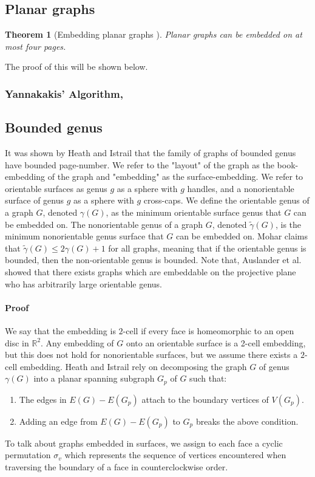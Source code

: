 \documentclass[]{article}
\newtheorem{theorem}{Theorem}
\theoremstyle{definition}
\numberwithin{theorem}{section}
\numberwithin{equation}{section}
\begin{document}
\subsection{Planar graphs}\label{ssec:Planar_Graphs}
\begin{theorem}[Embedding planar graphs \cite{yannakakisEmbeddingPlanarGraphs1989}] \label{thm:4Pages_Planar}
	Planar graphs can be embedded on at most four pages.
\end{theorem}
The proof of this will be shown below.
\subsubsection{Yannakakis' Algorithm, \cite{yannakakisEmbeddingPlanarGraphs1989}}\label{ssec:Yannakakis_Alg}


\subsection{Bounded genus}
It was shown by Heath and Istrail that the family of graphs of bounded genus have bounded page-number. 
We refer to the "layout" of the graph as the book-embedding of the graph and "embedding" as the surface-embedding. We refer to orientable surfaces as genus $g$ as a sphere with $g$ handles, and a nonorientable surface of genus $g$ as a sphere with $g$ cross-caps. We define the orientable genus of a graph $G$, denoted $\gamma(G)$, as the minimum orientable surface genus that $G$ can be embedded on. The nonorientable genus of a graph $G$, denoted $\tilde{\gamma}(G)$, is the minimum nonorientable genus surface that $G$ can be embedded on. Mohar\cite{moharOrientableGenusGraphs1998} claims that $\tilde{\gamma}(G) \leq 2 \gamma(G) + 1$ for all graphs, meaning that if the orientable genus is bounded, then the non-orientable genus is bounded. Note that, Auslander et al.\cite{auslanderImbeddingGraphsManifolds1963} showed that there exists graphs which are embeddable on the projective plane who has arbitrarily large orientable genus. 
\paragraph{Proof}
We say that the embedding is $2$-cell if every face is homeomorphic to an open disc in $\mathbb{R}^2$. Any embedding of $G$ onto an orientable surface is a 2-cell embedding, but this does not hold for nonorientable surfaces, but we assume there exists a $2$-cell embedding.
Heath and Istrail rely on decomposing the graph $G$ of genus $\gamma(G)$ into a planar spanning subgraph $G_p$ of $G$ such that:
\begin{enumerate}
	\item The edges in $E(G) - E(G_p)$ attach to the boundary vertices of $V(G_p)$. 
	\item Adding an edge from $E(G) - E(G_p)$ to $G_p$ breaks the above condition. 
\end{enumerate}
To talk about graphs embedded in surfaces, we assign to each face a cyclic permutation $\sigma_v$ which represents the sequence of vertices encountered when traversing the boundary of a face in counterclockwise order.
\end{document}
